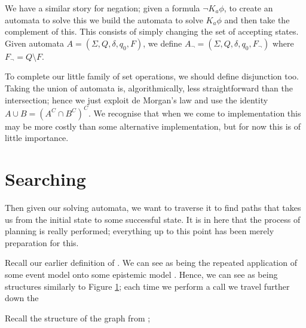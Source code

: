 \documentclass[10pt, a4paper]{report}
\begin{document}
\bigskip

We have a similar story for negation; given a formula $\neg K_a \phi$, to create
an automata to solve this we build the automata to solve $K_a \phi$ and then
take the complement of this. This consists of simply changing the set of
accepting states. Given automata $A = (\Sigma, Q, \delta, q_0, F)$, we define
$A_\neg = (\Sigma, Q, \delta, q_0, F_\neg)$ where $F_\neg = Q \setminus F$.

\bigskip

To complete our little family of set operations, we should define disjunction
too. Taking the union of automata is, algorithmically, less straightforward than
the intersection; hence we just exploit de Morgan's law and use the identity $A
\cup B = (A^C \cap B^C)^C$. We recognise that when we come to implementation
this may be more costly than some alternative implementation, but for now this
is of little importance. 

\section{Searching}

Then given our solving automata, we want to traverse it to find paths that takes
us from the initial state to some successful state. It is in here that the
process of planning is really performed; everything up to this point has been
merely preparation for this. 

Recall our earlier definition of \mestar. We can see \mestar as being the
repeated application of some event model  onto some epistemic model
. Hence, we can see \mestar as being structures similarly to Figure
\ref{fig:mestarStructure}; each time we perform a call we travel further down
the 

Recall the structure of the graph \mestar from ;

\begin{figure}[h]
  \centering
  \caption{}
  \label{fig:mestarStructure}
\end{figure}
\end{document}
